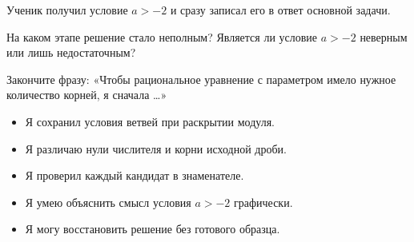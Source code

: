 \begin{practicebox}
  Ученик получил условие \(a>-2\) и сразу записал его в ответ основной
  задачи.

  На каком этапе решение стало неполным? Является ли условие \(a>-2\)
  неверным или лишь недостаточным?
\end{practicebox}

\begin{reflectionbox}
  Закончите фразу: «Чтобы рациональное уравнение с параметром имело нужное
  количество корней, я сначала \ldots»
\end{reflectionbox}

\begin{questionsbox}
  \begin{itemize}[label=\(\square\)]
    \item Я сохранил условия ветвей при раскрытии модуля.
    \item Я различаю нули числителя и корни исходной дроби.
    \item Я проверил каждый кандидат в знаменателе.
    \item Я умею объяснить смысл условия \(a>-2\) графически.
    \item Я могу восстановить решение без готового образца.
  \end{itemize}
\end{questionsbox}
